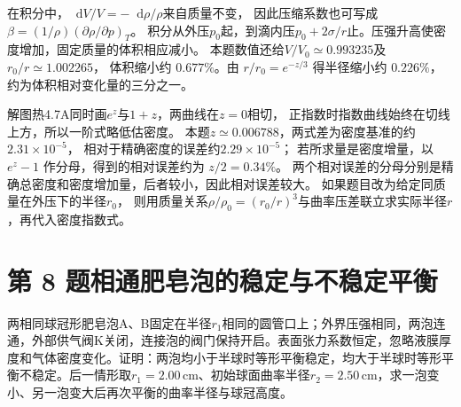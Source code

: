 \documentclass[UTF8,fontset=fandol,a4paper,11pt]{ctexart}
\newcommand{\dd}{\mathop{}\!\mathrm{d}}
\begin{document}
在积分中，$\dd V/V=-\dd\rho/\rho$来自质量不变，
因此压缩系数也可写成$\beta=(1/\rho)(\partial\rho/\partial p)_T$。
积分从外压$p_0$起，到滴内压$p_0+2\sigma/r$止。压强升高使密度增加，固定质量的体积相应减小。
本题数值还给$V/V_0\simeq0.993235$及$r_0/r\simeq1.002265$，
体积缩小约 $0.677\%$。由 $r/r_0=e^{-z/3}$ 得半径缩小约 $0.226\%$，约为体积相对变化量的三分之一。

解图热4.7A同时画$e^z$与$1+z$，两曲线在$z=0$相切，
正指数时指数曲线始终在切线上方，所以一阶式略低估密度。
本题$z\simeq0.006788$，两式差为密度基准的约$2.31\times10^{-5}$，
相对于精确密度的误差约$2.29\times10^{-5}$；
若所求量是密度增量，以 $e^z-1$ 作分母，得到的相对误差约为 $z/2=0.34\%$。
两个相对误差的分母分别是精确总密度和密度增加量，后者较小，因此相对误差较大。
如果题目改为给定同质量在外压下的半径$r_0$，
则用质量关系$\rho/\rho_0=(r_0/r)^3$与曲率压差联立求实际半径$r$，再代入密度指数式。




\section*{第 8 题\quad 相通肥皂泡的稳定与不稳定平衡}

两相同球冠形肥皂泡A、B固定在半径$r_1$相同的圆管口上；外界压强相同，两泡连通，外部供气阀K关闭，连接泡的阀门保持开启。表面张力系数恒定，忽略液膜厚度和气体密度变化。证明：两泡均小于半球时等形平衡稳定，均大于半球时等形平衡不稳定。后一情形取$r_1=2.00\,\mathrm{cm}$、初始球面曲率半径$r_2=2.50\,\mathrm{cm}$，求一泡变小、另一泡变大后再次平衡的曲率半径与球冠高度。
\end{document}
